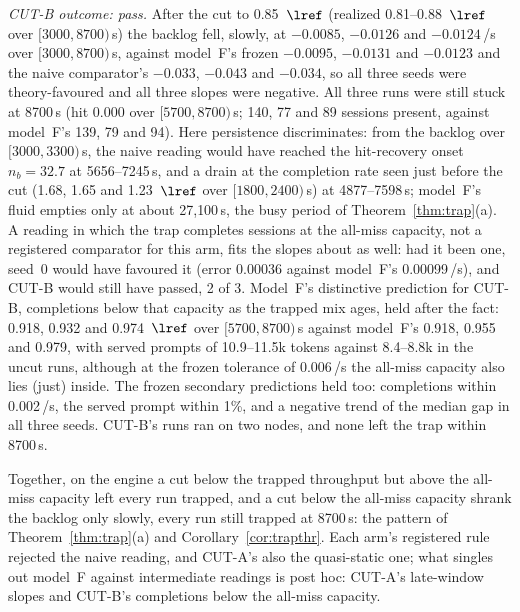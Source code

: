 \begin{itemize}[leftmargin=*,nosep]
\emph{CUT-B outcome: pass.} After the cut to 0.85~$\lref$ (realized 0.81--0.88~$\lref$ over $[3000,8700)$\,s) the backlog
fell, slowly, at $-0.0085$, $-0.0126$ and $-0.0124$\,/s over $[3000,8700)$\,s, against model~F's frozen $-0.0095$, $-0.0131$
and $-0.0123$ and the naive comparator's $-0.033$, $-0.043$ and $-0.034$, so all three seeds were theory-favoured and all three
slopes were negative. All three runs were still stuck at 8700\,s (hit 0.000 over $[5700,8700)$\,s; 140, 77 and 89 sessions present,
against model~F's 139, 79 and 94). Here persistence discriminates: from the backlog over $[3000,3300)$\,s, the naive reading would
have reached the hit-recovery onset $n_b=32.7$ at 5656--7245\,s, and a drain at the completion rate seen just before the cut (1.68,
1.65 and 1.23~$\lref$ over $[1800,2400)$\,s) at 4877--7598\,s; model~F's fluid empties only at about 27{,}100\,s, the busy period of
Theorem~\ref{thm:trap}(a). A reading in which the trap completes sessions at the all-miss capacity, not a registered comparator for
this arm, fits the slopes about as well: had it been one, seed~0 would have favoured it (error 0.00036 against model~F's
0.00099\,/s), and CUT-B would still have passed, 2 of 3. Model~F's distinctive prediction for CUT-B, completions below that capacity as the trapped
mix ages, held after the fact: 0.918, 0.932 and 0.974~$\lref$ over $[5700,8700)$\,s against model~F's 0.918, 0.955 and 0.979, with
served prompts of 10.9--11.5k tokens against 8.4--8.8k in the uncut runs, although at the frozen tolerance of 0.006\,/s the
all-miss capacity also lies (just) inside. The frozen secondary predictions held too: completions within 0.002\,/s, the served
prompt within 1\%, and a negative trend of the median gap in all three seeds. CUT-B's runs ran on two nodes, and none left the trap within 8700\,s.

Together, on the engine a cut below the trapped throughput but above the all-miss capacity left every run trapped, and a cut below
the all-miss capacity shrank the backlog only slowly, every run still trapped at 8700\,s: the pattern of Theorem~\ref{thm:trap}(a) and Corollary~\ref{cor:trapthr}. Each
arm's registered rule rejected the naive reading, and CUT-A's also the quasi-static one; what singles out model~F against
intermediate readings is post hoc: CUT-A's late-window slopes and CUT-B's completions below the all-miss capacity.
\end{itemize}

